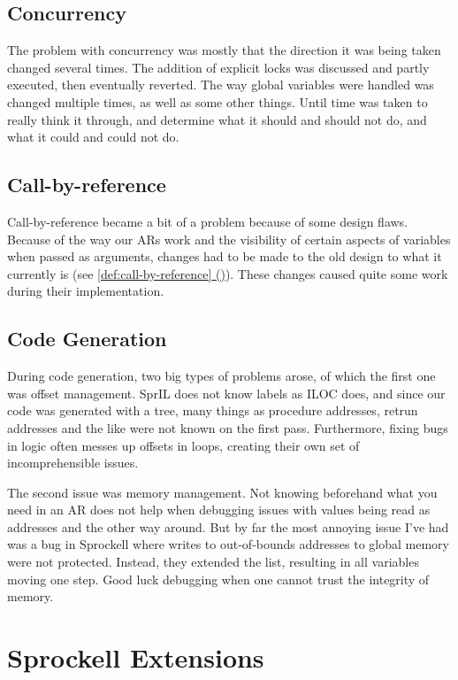 \documentclass[twoside]{report}
\newcommand*{\fullref}[1]{\hyperref[{#1}]{\ref*{#1} (\nameref*{#1})}}
\begin{document}
\section{Concurrency}
The problem with concurrency was mostly that the direction it was being taken changed several times. The addition of explicit locks was discussed and partly executed, then eventually reverted. The way global variables were handled was changed multiple times, as well as some other things. Until time was taken to really think it through, and determine what it should and should not do, and what it could and could not do. 

\section{Call-by-reference}
Call-by-reference became a bit of a problem because of some design flaws. Because of the way our ARs work and the visibility of certain aspects of variables when passed as arguments, changes had to be made to the old design to what it currently is (see \fullref{def:call-by-reference}). These changes caused quite some work during their implementation.

\section{Code Generation}
During code generation, two big types of problems arose, of which the first one was offset management. SprIL does not know labels as ILOC does, and since our code was generated with a tree, many things as procedure addresses, retrun addresses and the like were not known on the first pass. Furthermore, fixing bugs in logic often messes up offsets in loops, creating their own set of incomprehensible issues.

The second issue was memory management. Not knowing beforehand what you need in an AR does not help when debugging issues with values being read as addresses and the other way around. But by far the most annoying issue I've had was a bug in Sprockell where writes to out-of-bounds addresses to global memory were not protected. Instead, they extended the list, resulting in all variables moving one step. Good luck debugging when one cannot trust the integrity of memory.


\chapter{Sprockell Extensions}
\label{sprockell_extensions}
\end{document}
